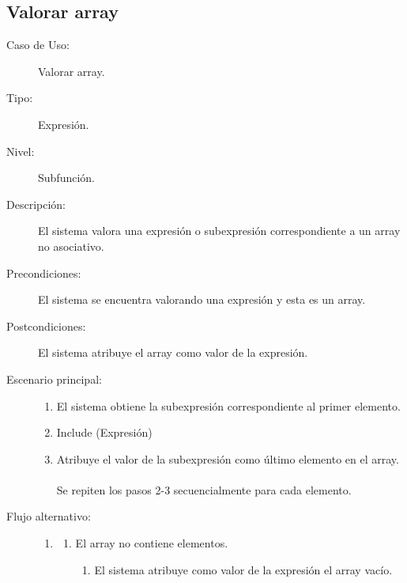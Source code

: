 \subsection {Valorar array}
\begin{framed}
\FloatBarrier
\begin{description}
   \item[Caso de Uso:]  Valorar array.
   \item [Tipo:] Expresión.
   \item[Nivel:]  Subfunción.
   \item[Descripción:] 
   El sistema valora una expresión o subexpresión correspondiente a
   un array no asociativo.
   \item[Precondiciones:] 
   El sistema se encuentra valorando una expresión y esta es un array.
   \item[Postcondiciones:] 
   El sistema atribuye el array como valor de la expresión.
   \item[Escenario principal:] \hfill
   \begin{enumerate}
   \item El sistema obtiene la subexpresión correspondiente al primer elemento.
   \item Include (Expresión)
   \item Atribuye el valor de la subexpresión como último elemento en el array.\\\\\hfill\hfill
   Se repiten los pasos 2-3 secuencialmente para cada elemento.
   \end{enumerate}
   \item[Flujo alternativo:] \hfill 
   \begin{enumerate} \itemsep1pt \parskip0pt 
   \setcounter{enumi}{0}
   \renewcommand{\labelenumi}{}
   \renewcommand{\labelenumiii}{\arabic{enumiii}.}
   \renewcommand{\labelenumii}{\arabic{enumi}\alph{enumii}.}
      \item 
      \begin {enumerate}
         \setcounter{enumii}{0}
         \item El array no contiene elementos.
         \begin{enumerate}
         \item El sistema atribuye como valor de la expresión el array vacío.
         \end{enumerate}
      \end{enumerate}
   \end{enumerate}
\end{description}
 \FloatBarrier
\end{framed}
